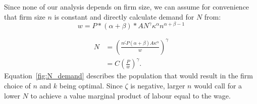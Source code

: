 Since none of our analysis depends on firm size, we can assume for convenience that firm size $n$ is constant and directly calculate demand for $N$ from:
\[w  = P*(\alpha+\beta)*AN^\gamma \kappa^\alpha n^{\alpha+\beta-1}  \]

\begin{align}\label{fig:N_demand}
N   &= (\frac{n^\zeta P(\alpha+\beta)A\kappa^\alpha}{w})^\gamma  \nonumber\\
    &= C \left(\frac{P}{w}\right)^\gamma.
\end{align}
Equation~\ref{fig:N_demand} describes the population that would result in the firm choice of $n$ and $k$ being optimal. Since $\zeta$ is negative, larger  $n$ would call for a lower $N$ to achieve a value marginal product of labour equal to the wage.



